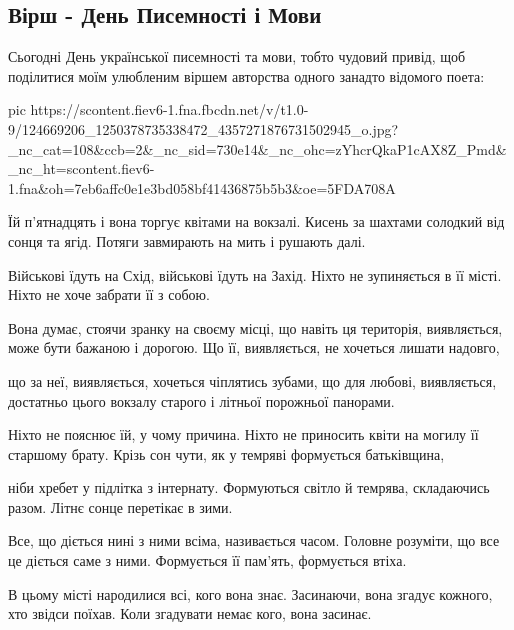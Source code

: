  
 
 

\subsection{Вірш - День Писемності і Мови}

Сьогодні День української писемності та мови, тобто чудовий привід, щоб
поділитися моїм улюбленим віршем авторства одного занадто відомого поета:

\ifcmt
pic https://scontent.fiev6-1.fna.fbcdn.net/v/t1.0-9/124669206_1250378735338472_4357271876731502945_o.jpg?_nc_cat=108&ccb=2&_nc_sid=730e14&_nc_ohc=zYhcrQkaP1cAX8Z_Pmd&_nc_ht=scontent.fiev6-1.fna&oh=7eb6affc0e1e3bd058bf41436875b5b3&oe=5FDA708A
\fi

\obeycr
Їй п’ятнадцять і вона торгує квітами на вокзалі.
Кисень за шахтами солодкий від сонця та ягід.
Потяги завмирають на мить і рушають далі.

Військові їдуть на Схід, військові їдуть на Захід.
Ніхто не зупиняється в її місті.
Ніхто не хоче забрати її з собою.

Вона думає, стоячи зранку на своєму місці,
що навіть ця територія, виявляється, може бути бажаною і дорогою.
Що її, виявляється, не хочеться лишати надовго,

що за неї, виявляється, хочеться чіплятись зубами,
що для любові, виявляється, достатньо цього вокзалу старого
і літньої порожньої панорами.

Ніхто не пояснює їй, у чому причина.
Ніхто не приносить квіти на могилу її старшому брату.
Крізь сон чути, як у темряві формується батьківщина,

ніби хребет у підлітка з інтернату.
Формуються світло й темрява, складаючись разом.
Літнє сонце перетікає в зими.

Все, що діється нині з ними всіма, називається часом.
Головне розуміти, що все це діється саме з ними.
Формується її пам’ять, формується втіха.

В цьому місті народилися всі, кого вона знає.
Засинаючи, вона згадує кожного, хто звідси поїхав.
Коли згадувати немає кого, вона засинає.
\restorecr
